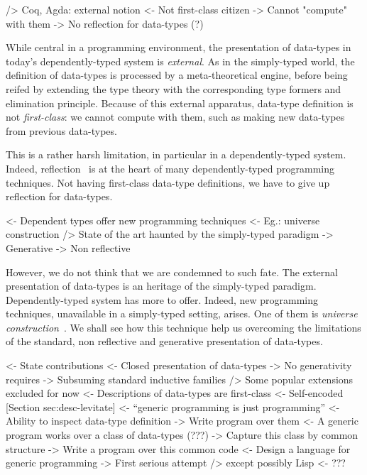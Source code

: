 \documentclass[preprint
              , authoryear
              ]{sigplanconf}
\newenvironment{wstructure}{\comment}{\endcomment}
\begin{document}
\begin{wstructure}
        /> Coq, Agda: external notion
            <- Not first-class citizen
            -> Cannot "compute" with them
            -> No reflection for data-types (?)
\end{wstructure}

While central in a programming environment, the presentation of
data-types in today's dependently-typed system is
\emph{external}. As in the simply-typed world, the definition of
data-types is processed by a meta-theoretical engine, before being
reifed by extending the type theory with the corresponding type
formers and elimination principle. Because of this external apparatus,
data-type definition is not \emph{first-class}: we cannot compute with
them, such as making new data-types from previous data-types. 

This is a rather harsh limitation, in particular in a
dependently-typed system. Indeed, reflection~\cite{allen:reflection,
  gregoire:ring-solver} is at the heart of many dependently-typed
programming techniques. Not having first-class data-type definitions,
we have to give up reflection for data-types.

\begin{wstructure}
    <- Dependent types offer new programming techniques
        <- Eg.: universe construction
        /> State of the art haunted by the simply-typed paradigm
            -> Generative
            -> Non reflective
\end{wstructure}

However, we do not think that we are condemned to such fate. The
external presentation of data-types is an heritage of the simply-typed
paradigm. Dependently-typed system has more to offer. Indeed, new
programming techniques, unavailable in a simply-typed setting,
arises. One of them is \emph{universe
  construction}~\cite{martin-lof:itt}. We shall see how this technique
help us overcoming the limitations of the standard, non reflective and
generative presentation of data-types.

\begin{wstructure}
<- State contributions
    <- Closed presentation of data-types 
        -> No generativity requires
        -> Subsuming standard inductive families 
            /> Some popular extensions excluded for now
    <- Descriptions of data-types are first-class 
        <- Self-encoded [Section sec:desc-levitate]
    <- ``generic programming is just programming''
        <- Ability to inspect data-type definition
            -> Write program over them
        <- A generic program works over a class of data-types (???)
            -> Capture this class by common structure
            -> Write a program over this common code
    <- Design a language for generic programming
        -> First serious attempt
            /> except possibly Lisp
                <- ???
\end{wstructure}
\end{document}
